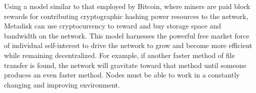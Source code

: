\documentclass[a4paper,12pt]{article}
\begin{document}
Using a model similar to that employed by Bitcoin, where miners are paid block rewards for contributing cryptographic hashing power resources to the network, Metadisk can use cryptocurrency to reward and buy storage space and bandwidth on the network. This model harnesses the powerful free market force of individual self-interest to drive the network to grow and become more efficient while remaining decentralized.  For example, if another faster method of file transfer is found, the network will gravitate toward that method until someone produces an even faster method. Nodes must be able to work in a constantly changing and improving environment.  
\end{document}
